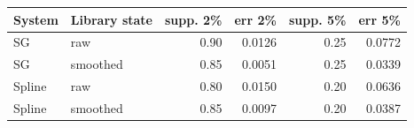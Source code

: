 \begin{tabular}{llrrrr}\toprule
System & Library state & supp. 2\% & err 2\% & supp. 5\% & err 5\% \\\midrule
SG & raw & 0.90 & 0.0126 & 0.25 & 0.0772 \\
SG & smoothed & 0.85 & 0.0051 & 0.25 & 0.0339 \\
Spline & raw & 0.80 & 0.0150 & 0.20 & 0.0636 \\
Spline & smoothed & 0.85 & 0.0097 & 0.20 & 0.0387 \\
\bottomrule\end{tabular}
